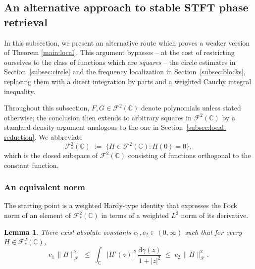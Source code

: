 \documentclass[11pt]{amsart}
\newtheorem{lemma}[theorem]{Lemma}
\theoremstyle{remark}
\newcommand{\C}{\mathbb{C}}
\newcommand{\abs}[1]{\lvert #1 \rvert}
\newcommand{\norm}[1]{\lVert #1 \rVert}
\newcommand{\dd}{\mathrm{d}}
\begin{document}
\subsection{An alternative approach to stable STFT phase retrieval}\label{subsec:bochner}
In this subsection, we present an alternative route which proves a weaker version of Theorem \ref{main:local}. This argument bypasses -- at the cost of restricting ourselves to the class of functions which are \emph{squares} -- the circle estimates
in Section~\ref{subsec:circle} and the frequency localization in
Section~\ref{subsec:blocks}, replacing them with a direct integration
by parts 
and a weighted Cauchy integral inequality. %

\medskip

Throughout this subsection, $F, G \in \mathcal{F}^2(\C)$ denote polynomials
unless stated otherwise; the conclusion then extends to arbitrary
squares in $\mathcal{F}^2(\C)$ by a standard density argument analogous
to the one in Section~\ref{subsec:local-reduction}. We abbreviate
\[
\mathcal{F}^2_\ast(\C) \;:=\; \bigl\{H \in \mathcal{F}^2(\C) : H(0) = 0\bigr\},
\]
which is the closed subspace of $\mathcal{F}^2(\C)$ consisting of functions orthogonal to the constant
function.

\subsubsection{An equivalent norm}\label{sec:weighted-norm}
The starting point is a weighted Hardy-type identity that expresses the
Fock norm of an element of $\mathcal{F}^2_\ast(\C)$ in terms of a weighted
$L^2$ norm of its derivative.

\begin{lemma}\label{lem:weighted-equiv}
There exist absolute constants $c_1, c_2 \in (0,\infty)$ such that for
every $H \in \mathcal{F}^2_\ast(\C)$,
\begin{equation}\label{eq:weighted-equiv}
c_1\, \norm{H}_{\mathcal{F}}^2
\;\le\;
\int_{\C} \abs{H'(z)}^2\, \frac{\dd\gamma(z)}{1+\abs{z}^2}
\;\le\;
c_2\, \norm{H}_{\mathcal{F}}^2.
\end{equation}
\end{lemma}
\end{document}
